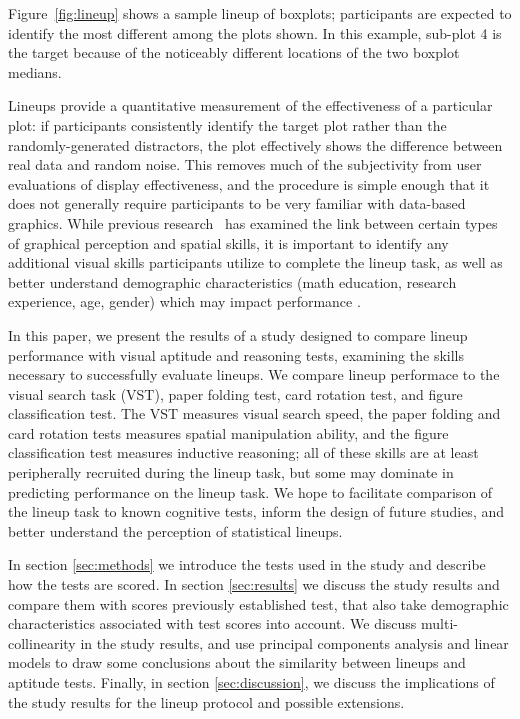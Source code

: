 \documentclass[11pt]{isuthesis}\usepackage[]{graphicx}\usepackage[]{color}
\begin{document}
Figure~\ref{fig:lineup} shows a sample lineup of boxplots; participants are expected to identify the most different among the plots shown. In this example, sub-plot 4 is the target  because of the noticeably different locations of the two boxplot medians.




Lineups provide a quantitative measurement of the effectiveness of a particular plot: if participants consistently identify the target plot rather than the randomly-generated distractors, the plot effectively shows the difference between real data and random noise. 
This removes much of the subjectivity from user evaluations of display effectiveness, and the procedure is simple enough that it does not generally require participants to be very familiar with data-based graphics. 
While previous research~\citep{lowrie2007solving,mayer1994whom} has examined the link between certain types of graphical perception and spatial skills, it is important to identify any additional visual skills participants utilize to complete the lineup task, as well as better understand demographic characteristics (math education, research experience, age, gender) which may impact performance \citep{humanfactorslineups}. 

In this paper, we present the results of a study designed to compare lineup performance with visual aptitude and reasoning tests, examining the skills necessary to successfully evaluate lineups. 
We compare lineup performace to the visual search task (VST), paper folding test, card rotation test, and figure classification test. 
The VST measures visual search speed\citep{goldstein1973validity}, the paper folding and card rotation tests measures spatial manipulation ability, and the figure classification test measures inductive reasoning\citep{ekstrom1976manual}; 
all of these skills are at least peripherally recruited during the lineup task, but some may dominate in predicting performance on the lineup task. 
We hope to facilitate comparison of the lineup task to known cognitive tests, inform the design of future studies, and better understand the perception of statistical lineups. 


In section \ref{sec:methods} we introduce the tests used in the study and describe how the tests are scored. In section \ref{sec:results} we discuss the study results and compare them with scores previously established test, that also take  demographic characteristics associated with test scores into account. We discuss multi-collinearity in the study results, and use principal components analysis and linear models to draw some conclusions about the similarity between lineups and aptitude tests. Finally, in section \ref{sec:discussion}, we discuss the implications of the study results for the lineup protocol and  possible extensions. 
\end{document}
